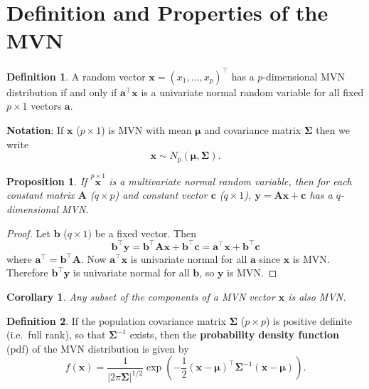 \documentclass[]{book}
\newtheorem{corollary}{Corollary}[chapter]
\newtheorem{proposition}{Proposition}[chapter]
\theoremstyle{definition}
\newtheorem{definition}{Definition}[chapter]
\theoremstyle{definition}
\theoremstyle{definition}
\theoremstyle{remark}
\begin{document}
\hypertarget{definition-and-properties-of-the-mvn}{%
\section{Definition and Properties of the MVN}\label{definition-and-properties-of-the-mvn}}

\begin{definition}
\protect\hypertarget{def:mvn}{}{\label{def:mvn} }A random vector \(\boldsymbol x=(x_1, \ldots , x_p)^\top\) has a \(p\)-dimensional MVN distribution if and only if \(\boldsymbol a^\top \boldsymbol x\) is a univariate normal random variable for all fixed \(p \times 1\) vectors \(\boldsymbol a\).
\end{definition}

\textbf{Notation}: \quad If \(\boldsymbol x\) (\(p \times 1\)) is MVN with mean \(\boldsymbol \mu\) and covariance matrix \(\boldsymbol \Sigma\) then we write
\[ \boldsymbol x\sim N_p (\boldsymbol \mu, \boldsymbol \Sigma).\]

\begin{proposition}
\protect\hypertarget{prp:six1}{}{\label{prp:six1} }If \(\stackrel{p \times 1}{\boldsymbol x}\) is a multivariate normal random variable, then for each constant matrix \(\boldsymbol A\) (\(q \times p\)) and constant vector \(\boldsymbol c\) (\(q \times 1\)), \(\boldsymbol y= \boldsymbol A\boldsymbol x+ \boldsymbol c\) has a \(q\)-dimensional MVN.
\end{proposition}

\begin{proof}
{}Let \(\boldsymbol b\) (\(q \times 1)\) be a fixed vector. Then
\[ \boldsymbol b^\top \boldsymbol y= \boldsymbol b^\top \boldsymbol A\boldsymbol x+ \boldsymbol b^\top \boldsymbol c= \boldsymbol a^\top \boldsymbol x+ \boldsymbol b^\top \boldsymbol c\]
where \(\boldsymbol a^\top = \boldsymbol b^\top \boldsymbol A\). Now \(\boldsymbol a^\top \boldsymbol x\) is univariate normal for all \(\boldsymbol a\) since \(\boldsymbol x\) is MVN. Therefore \(\boldsymbol b^\top \boldsymbol y\) is univariate normal for all \(\boldsymbol b\), so \(\boldsymbol y\) is MVN.
\end{proof}

\begin{corollary}
\protect\hypertarget{cor:csix1}{}{\label{cor:csix1} }Any subset of the components of a MVN vector \(\boldsymbol x\) is also MVN.
\end{corollary}

\begin{definition}
\protect\hypertarget{def:mvnpdf}{}{\label{def:mvnpdf} }If the population covariance matrix \(\boldsymbol \Sigma\) (\(p \times p\)) is positive definite (i.e.~full rank), so that \(\boldsymbol \Sigma^{-1}\) exists,
then the \textbf{probability density function} (pdf) of the MVN distribution is given by
\[ f(\boldsymbol x) = \frac{1}{| 2 \pi \boldsymbol \Sigma|^{1/2}} \exp \left(-\frac{1}{2}(\boldsymbol x- \boldsymbol \mu)^\top \boldsymbol \Sigma^{-1} (\boldsymbol x- \boldsymbol \mu) \right).\]
\end{definition}
\end{document}
